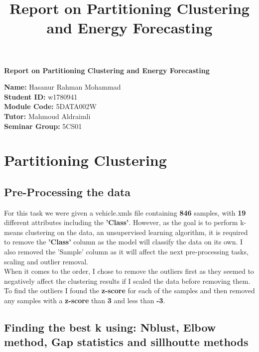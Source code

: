 \documentclass[11pt]{article}
\title{Report on Partitioning Clustering and  Energy Forecasting}
\newcommand{\name}{Hasanur Rahman Mohammad}
\newcommand{\studentID}{w1780941}
\newcommand{\moduleCode}{5DATA002W}
\newcommand{\tutor}{Mahmoud Aldraimli}
\newcommand{\seminarGroup}{5CS01}
\begin{document}
\begin{titlepage}

    \center
    {\LARGE\bfseries Report on Partitioning Clustering and Energy Forecasting}
    \\ [2cm]
    \begin{flushleft}
        \textbf{Name: }\name \\
        \textbf{Student ID: }\studentID \\[0.5cm]
        \textbf{Module Code: }\moduleCode \\
        \textbf{Tutor: }\tutor \\
        \textbf{Seminar Group: }\seminarGroup\\
    \end{flushleft}

\end{titlepage}

\tableofcontents
\newpage

\section{Partitioning Clustering}
\subsection{Pre-Processing the data}
For this task we were given a vehicle.xmls file containing \textbf{846} samples, with \textbf{19} different attributes
including the \textbf{'Class'}. However, as the goal is to perform k-means clustering on the data, an unsupervised learning algorithm,
it is required to remove the \textbf{'Class'} column as the model will classify the data on its own. I also removed the 'Sample' column as it will
affect the next pre-processing tasks, scaling and outlier removal.\\

When it comes to the order, I chose to remove the outliers first as they seemed to negatively affect the clustering results if I scaled the data before removing them.
To find the outliers I found the \textbf{z-score} for each of the samples and then removed any samples with a \textbf{z-score} than \textbf{3} and less than \textbf{-3}.

\subsection{Finding the best k using: Nblust, Elbow method, Gap statistics and sillhoutte methods}
\end{document}
